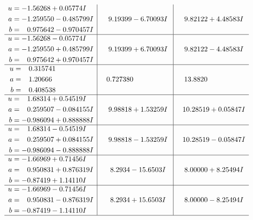 \documentclass[1p]{elsarticle_modified}
\theoremstyle{definition}
\begin{document}
$$\begin{array}{c|c|c}
\begin{aligned}
u &= -1.56268 + 0.05774 I \\
a &= -1.259550 - 0.485799 I \\
b &= \phantom{-}0.975642 - 0.970457 I\end{aligned}
 & \phantom{-}9.19399 - 6.70093 I & \phantom{-}9.82122 + 4.48583 I \\ \hline\begin{aligned}
u &= -1.56268 - 0.05774 I \\
a &= -1.259550 + 0.485799 I \\
b &= \phantom{-}0.975642 + 0.970457 I\end{aligned}
 & \phantom{-}9.19399 + 6.70093 I & \phantom{-}9.82122 - 4.48583 I \\ \hline\begin{aligned}
u &= \phantom{-}0.315741\phantom{ +0.000000I} \\
a &= \phantom{-}1.20666\phantom{ +0.000000I} \\
b &= \phantom{-}0.408538\phantom{ +0.000000I}\end{aligned}
 & \phantom{-}0.727380\phantom{ +0.000000I} & \phantom{-}13.8820\phantom{ +0.000000I} \\ \hline\begin{aligned}
u &= \phantom{-}1.68314 + 0.54519 I \\
a &= \phantom{-}0.259507 - 0.084155 I \\
b &= -0.986094 + 0.888888 I\end{aligned}
 & \phantom{-}9.98818 + 1.53259 I & \phantom{-}10.28519 + 0.05847 I \\ \hline\begin{aligned}
u &= \phantom{-}1.68314 - 0.54519 I \\
a &= \phantom{-}0.259507 + 0.084155 I \\
b &= -0.986094 - 0.888888 I\end{aligned}
 & \phantom{-}9.98818 - 1.53259 I & \phantom{-}10.28519 - 0.05847 I \\ \hline\begin{aligned}
u &= -1.66969 + 0.71456 I \\
a &= \phantom{-}0.950831 + 0.876319 I \\
b &= -0.87419 + 1.14110 I\end{aligned}
 & \phantom{-}8.2934 - 15.6503 I & \phantom{-}8.00000 + 8.25494 I \\ \hline\begin{aligned}
u &= -1.66969 - 0.71456 I \\
a &= \phantom{-}0.950831 - 0.876319 I \\
b &= -0.87419 - 1.14110 I\end{aligned}
 & \phantom{-}8.2934 + 15.6503 I & \phantom{-}8.00000 - 8.25494 I\\
 \hline 
 \end{array}$$\newpage\newpage\renewcommand{\arraystretch}{1}
\end{document}
